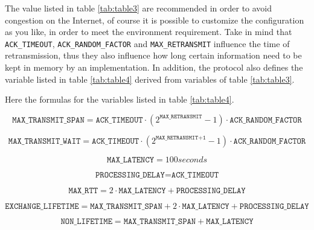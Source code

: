 	

	The value listed in table \ref{tab:table3} are recommended in order to avoid congestion on the Internet, of course it is possible to 
	customize the configuration as you like, in order to meet the environment requirement.\newline
	Take in mind that \texttt{ACK\_TIMEOUT}, \texttt{ACK\_RANDOM\_FACTOR} and \texttt{MAX\_RETRANSMIT} influence the time of retransmission,
	thus they also influence how long certain information need  to be  kept in memory by an implementation.\newline
	In addition, the protocol also defines the variable listed in table \ref{tab:table4} derived from variables of table \ref{tab:table3}.\newline
	
	
	
	Here the formulas for the variables listed in table \ref{tab:table4}.
	
	\begin{equation}
		\texttt{MAX\_TRANSMIT\_SPAN}=\texttt{ACK\_TIMEOUT}\cdot(2^{\texttt{MAX\_RETRANSMIT}}-1)\cdot\texttt{ACK\_RANDOM\_FACTOR}
	\end{equation}
	
	\begin{equation}
	\texttt{MAX\_TRANSMIT\_WAIT}=\texttt{ACK\_TIMEOUT}\cdot(2^{\texttt{MAX\_RETRANSMIT+1}}-1)\cdot\texttt{ACK\_RANDOM\_FACTOR}
	\end{equation}
	
	\begin{equation}
	\texttt{MAX\_LATENCY}=100 seconds
	\end{equation}
	
	\begin{equation}
	\texttt{PROCESSING\_DELAY}=\texttt{ACK\_TIMEOUT}
	\end{equation}
	
	\begin{equation}
	\texttt{MAX\_RTT}=2\cdot\texttt{MAX\_LATENCY}+\texttt{PROCESSING\_DELAY}
	\end{equation}
	
	\begin{equation}
	\texttt{EXCHANGE\_LIFETIME}=\texttt{MAX\_TRANSMIT\_SPAN}+2\cdot\texttt{MAX\_LATENCY}+\texttt{PROCESSING\_DELAY}
	\end{equation}
	
	\begin{equation}
	\texttt{NON\_LIFETIME}=\texttt{MAX\_TRANSMIT\_SPAN}+\texttt{MAX\_LATENCY}
	\end{equation}
	
